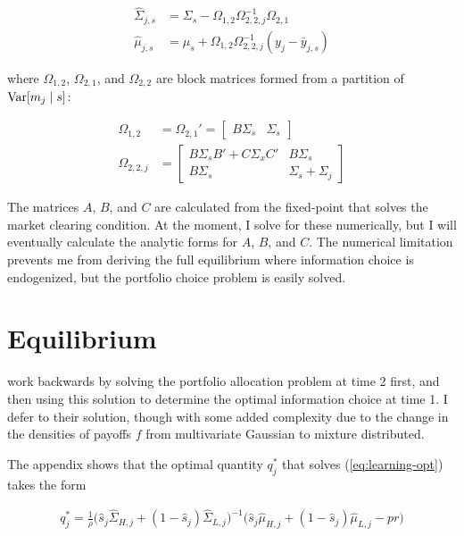 \documentclass{article}
\begin{document}
\begin{align*}
    \hat \Sigma_{j,s} &= \Sigma_s - \Omega_{1,2} \Omega_{2,2,j}^{-1} \Omega_{2,1} \\ 
    \hat \mu_{j,s} &= \mu_s + \Omega_{1,2} \Omega_{2,2,j}^{-1} (y_j - \bar y_{j,s})
\end{align*}

\noindent where $\Omega_{1,2}$, $\Omega_{2,1}$, and $\Omega_{2,2}$ are block matrices formed from a partition of $\text{Var}[m_j \mid s]$:

\begin{align*}
    \Omega_{1,2} &= \Omega_{2,1}' = \begin{bmatrix}
        B \Sigma_s & \Sigma_s
    \end{bmatrix} \\
    \Omega_{2,2,j} &= \begin{bmatrix}
        B\Sigma_s B' + C \Sigma_x C' & B \Sigma_s \\
        B \Sigma_s & \Sigma_s + \Sigma_j
    \end{bmatrix}
\end{align*}

\noindent The matrices $A$, $B$, and $C$ are calculated from the fixed-point that solves the market clearing condition. At the moment, I solve for these numerically, but I will eventually calculate the analytic forms for $A$, $B$, and $C$. The numerical limitation prevents me from deriving the full equilibrium where information choice is endogenized, but the portfolio choice problem is easily solved.

\section{Equilibrium}

\textcite{kacperczyk_rational_2016} work backwards by solving the portfolio allocation problem at time 2 first, and then using this solution to determine the optimal information choice at time 1. I defer to their solution, though with some added complexity due to the change in the densities of payoffs $f$ from multivariate Gaussian to mixture distributed.

The appendix shows that the optimal quantity $q^*_j$ that solves (\ref{eq:learning-opt}) takes the form

\newcommand{\shat}{\hat s_j}
\newcommand{\hShat}{\hat \Sigma_{H,j}}
\newcommand{\lShat}{\hat \Sigma_{L,j}}
\newcommand{\hMhat}{\hat \mu_{H,j}}
\newcommand{\lMhat}{\hat \mu_{L,j}}
\begin{align}
    q^*_j = \frac{1}{\rho}\big(\shat \hShat + (1-\shat) \lShat\big)^{-1}\big(\shat \hMhat + (1-\shat) \lMhat - pr \big)
\end{align}
\end{document}
